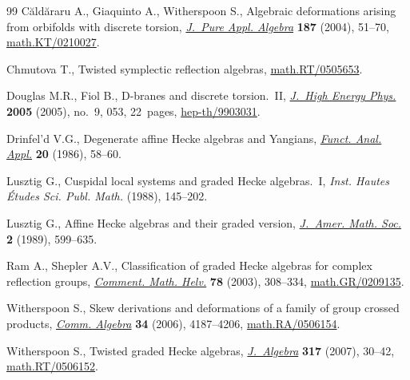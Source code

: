 \documentclass[11pt]{article}
\numberwithin{equation}{section}
\begin{document}
\begin{thebibliography}{99}
C{\u{a}}ld{\u{a}}raru A., Giaquinto A., Witherspoon S., Algebraic deformations
  arising from orbifolds with discrete torsion, \href{http://dx.doi.org/10.1016/j.jpaa.2003.10.004}{\textit{J.~Pure Appl. Algebra}}
  \textbf{187} (2004), 51--70, \href{http://arxiv.org/abs/math.KT/0210027}{math.KT/0210027}.

Chmutova T., Twisted symplectic ref\/lection algebras, \href{http://arxiv.org/abs/math.RT/0505653}{math.RT/0505653}.

Douglas M.R., Fiol B., D-branes and discrete torsion.~{II}, \href{http://dx.doi.org/10.1088/1126-6708/2005/09/053}{\textit{J.~High
  Energy Phys.}} \textbf{2005} (2005), no.~9, 053, 22~pages,
  \href{http://arxiv.org/abs/hep-th/9903031}{hep-th/9903031}.

Drinfel'd V.G., Degenerate af\/f\/ine {H}ecke algebras and {Y}angians,
  \href{http://dx.doi.org/10.1007/BF01077318}{\textit{Funct. Anal. Appl.}} \textbf{20} (1986), 58--60.

Lusztig G., Cuspidal local systems and graded {H}ecke algebras.~{I},
  \textit{Inst. Hautes \'Etudes Sci. Publ. Math.}  (1988), 145--202.

Lusztig G., Af\/f\/ine {H}ecke algebras and their graded version, \href{http://dx.doi.org/10.2307/1990945}{\textit{J.~Amer.
  Math. Soc.}} \textbf{2} (1989), 599--635.

Ram A., Shepler A.V., Classif\/ication of graded {H}ecke algebras for complex
  ref\/lection groups, \href{http://dx.doi.org/10.1007/s000140300013}{\textit{Comment. Math. Helv.}} \textbf{78} (2003),
  308--334, \href{http://arxiv.org/abs/math.GR/0209135}{math.GR/0209135}.

Witherspoon S., Skew derivations and deformations of a family of group crossed
  products, \href{http://dx.doi.org/10.1080/00927870600876367}{\textit{Comm. Algebra}} \textbf{34} (2006), 4187--4206,
  \href{http://arxiv.org/abs/math.RA/0506154}{math.RA/0506154}.

Witherspoon S., Twisted graded {H}ecke algebras, \href{http://dx.doi.org/10.1016/j.jalgebra.2007.05.025}{\textit{J.~Algebra}}
  \textbf{317} (2007), 30--42, \href{http://arxiv.org/abs/math.RT/0506152}{math.RT/0506152}.

\end{thebibliography}
\end{document}
